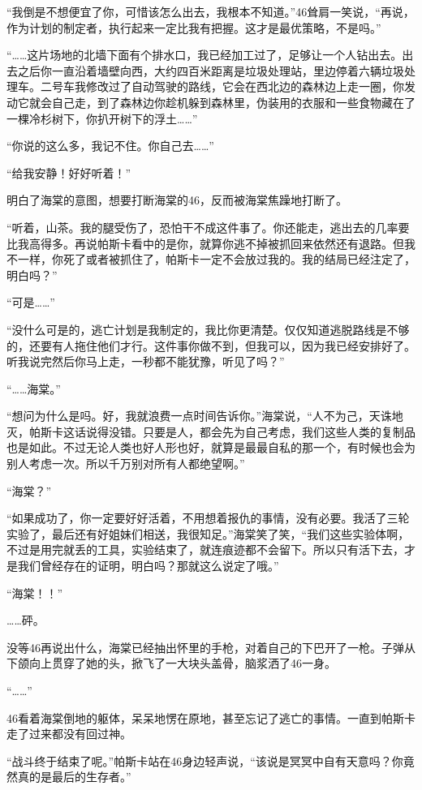 “我倒是不想便宜了你，可惜该怎么出去，我根本不知道。”46耸肩一笑说，“再说，作为计划的制定者，执行起来一定比我有把握。这才是最优策略，不是吗。”

“……这片场地的北墙下面有个排水口，我已经加工过了，足够让一个人钻出去。出去之后你一直沿着墙壁向西，大约四百米距离是垃圾处理站，里边停着六辆垃圾处理车。二号车我修改过了自动驾驶的路线，它会在西北边的森林边上走一圈，你发动它就会自己走，到了森林边你趁机躲到森林里，伪装用的衣服和一些食物藏在了一棵冷杉树下，你扒开树下的浮土……”

“你说的这么多，我记不住。你自己去……”

“给我安静！好好听着！”

明白了海棠的意图，想要打断海棠的46，反而被海棠焦躁地打断了。

“听着，山茶。我的腿受伤了，恐怕干不成这件事了。你还能走，逃出去的几率要比我高得多。再说帕斯卡看中的是你，就算你逃不掉被抓回来依然还有退路。但我不一样，你死了或者被抓住了，帕斯卡一定不会放过我的。我的结局已经注定了，明白吗？”

“可是……”

“没什么可是的，逃亡计划是我制定的，我比你更清楚。仅仅知道逃脱路线是不够的，还要有人拖住他们才行。这件事你做不到，但我可以，因为我已经安排好了。听我说完然后你马上走，一秒都不能犹豫，听见了吗？”

“……海棠。”

“想问为什么是吗。好，我就浪费一点时间告诉你。”海棠说，“人不为己，天诛地灭，帕斯卡这话说得没错。只要是人，都会先为自己考虑，我们这些人类的复制品也是如此。不过无论人类也好人形也好，就算是最最自私的那一个，有时候也会为别人考虑一次。所以千万别对所有人都绝望啊。”

“海棠？”

“如果成功了，你一定要好好活着，不用想着报仇的事情，没有必要。我活了三轮实验了，最后还有好姐妹们相送，我很知足。”海棠笑了笑，“我们这些实验体啊，不过是用完就丢的工具，实验结束了，就连痕迹都不会留下。所以只有活下去，才是我们曾经存在的证明，明白吗？那就这么说定了哦。”

“海棠！！”

……砰。

没等46再说出什么，海棠已经抽出怀里的手枪，对着自己的下巴开了一枪。子弹从下颌向上贯穿了她的头，掀飞了一大块头盖骨，脑浆洒了46一身。

“……”

46看着海棠倒地的躯体，呆呆地愣在原地，甚至忘记了逃亡的事情。一直到帕斯卡走了过来都没有回过神。

“战斗终于结束了呢。”帕斯卡站在46身边轻声说，“该说是冥冥中自有天意吗？你竟然真的是最后的生存者。”

